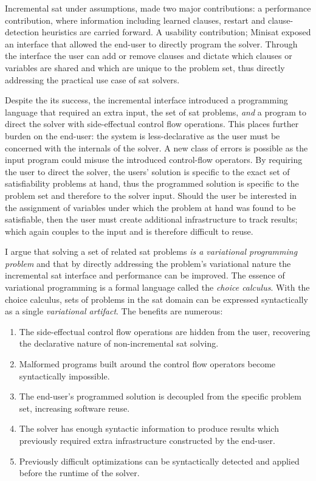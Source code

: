 Incremental \ac{sat} under assumptions, made two major contributions: a
performance contribution, where information including learned clauses, restart
and clause-detection heuristics are carried forward. A usability contribution;
Minisat exposed an interface that allowed the end-user to directly program the
solver. Through the interface the user can add or remove clauses and dictate
which clauses or variables are shared and which are unique to the problem set,
thus directly addressing the practical use case of \ac{sat} solvers.

Despite the its success, the incremental interface introduced a programming
language that required an extra input, the set of \ac{sat} problems, \emph{and}
a program to direct the solver with side-effectual control flow operations. This
places further burden on the end-user: the system is less-declarative as the
user must be concerned with the internals of the solver. A new class of errors
is possible as the input program could misuse the introduced control-flow
operators. By requiring the user to direct the solver, the users'
solution is specific to the exact set of satisfiability problems at hand, thus
the programmed solution is specific to the problem set and therefore to the
solver input. Should the user be interested in the assignment of variables under
which the problem at hand was found to be satisfiable, then the user must create
additional infrastructure to track results; which again couples to the input and
is therefore difficult to reuse.

I argue that solving a set of related \ac{sat} problems \emph{is a variational
  programming problem} and that by directly addressing the problem's variational
nature the incremental \ac{sat} interface and performance can be improved. The
essence of variational programming is a formal language called the \emph{choice
  calculus}. With the choice calculus, sets of problems in the \ac{sat} domain
can be expressed syntactically as a single \emph{variational artifact}. The
benefits are numerous:
\begin{enumerate}
  \item The side-effectual control flow operations are hidden from the user,
    recovering the declarative nature of non-incremental \ac{sat} solving.
  \item Malformed programs built around the control flow operators become
    syntactically impossible.
  \item The end-user's programmed solution is decoupled from the specific problem
    set, increasing software reuse.
  \item The solver has enough syntactic information to produce results which
    previously required extra infrastructure constructed by the end-user.
  \item Previously difficult optimizations can be syntactically detected and
    applied before the runtime of the solver.
\end{enumerate}


